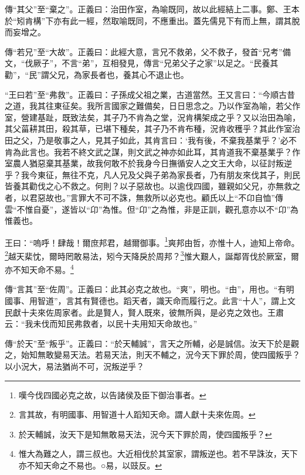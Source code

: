 {\noindent\zhuan{}\fzbyks 傳“其父”至“棄之”。正義曰：治田作室，為喻既同，故以此經結上二事。鄭、王本於“矧肯構”下亦有此一經，然取喻既同，不應重出。蓋先儒見下有而上無，謂其脫而妄增之。 \par}

{\noindent\zhuan{}\fzbyks 傳“若兄”至“大故”。正義曰：此經大意，言兄不救弟，父不救子，發首“兄考”備文，“伐厥子”，不言“弟”，互相發見，傳言“兄弟父子之家”以足之。“民養其勸”，“民”謂父兄，為家長者也，養其心不退止也。 \par}

{\noindent\shu{}\fzkt “王曰若”至“弗救”。正義曰：子孫成父祖之業，古道當然。王又言曰：“今順古昔之道，我其往東征矣。我所言國家之難備矣，日日思念之。乃以作室為喻，若父作室，營建基趾，既致法矣，其子乃不肯為之堂，況肯構架成之乎？又以治田為喻，其父菑耕其田，殺其草，已堪下種矣，其子乃不肯布種，況肯收穫乎？其此作室治田之父，乃是敬事之人，見其子如此，其肯言曰：‘我有後，不棄我基業乎？’必不肯為此言也。我若不終文武之謀，則文武之神亦如此耳，其肯道我不棄基業乎？作室農人猶惡棄其基業，故我何敢不於我身今日撫循安人之文王大命，以征討叛逆乎？我今東征，無往不克，凡人兄及父與子弟為家長者，乃有朋友來伐其子，則民皆養其勸伐之心不救之。何則？以子惡故也。以逾伐四國，雖親如父兄，亦無救之者，以君惡故也。”言罪大不可不誅，無救所以必克也。顧氏以上“不卬自恤”傳雲“不惟自憂”，遂皆以“卬”為惟。但“卬”之為惟，非是正訓，觀孔意亦以不“卬”為惟義也。 \par}

王曰：“嗚呼！肆哉！爾庶邦君，越爾御事。\footnote{嘆今伐四國必克之故，以告諸侯及臣下御治事者。}爽邦由哲，亦惟十人，迪知上帝命。\footnote{言其故，有明國事、用智道十人蹈知天命。謂人獻十夫來佐周。}越天棐忱，爾時罔敢易法，矧今天降戾於周邦？\footnote{於天輔誠，汝天下是知無敢易天法，況今天下罪於周，使四國叛乎？}惟大艱人，誕鄰胥伐於厥室，爾亦不知天命不易。\footnote{惟大為難之人，謂三叔也。大近相伐於其室家，謂叛逆也。若不早誅汝，天下亦不知天命之不易也。○易，以豉反。}


{\noindent\zhuan{}\fzbyks 傳“言其”至“佐周”。正義曰：此其必克之故也。“爽”，明也。“由”，用也。“有明國事、用智道”，言其有賢德也。蹈天者，識天命而履行之。此言“十人”，謂上文民獻十夫來佐周家者。此是賢人，賢人既來，彼無所與，是必克之效也。王肅云：“我未伐而知民弗救者，以民十夫用知天命故也。” \par}

{\noindent\zhuan{}\fzbyks 傳“於天”至“叛乎”。正義曰：“於天輔誠”，言天之所輔，必是誠信。汝天下於是觀之，始知無敢變易天法。若易天法，則天不輔之，況今天下罪於周，使四國叛乎？以小況大，易法猶尚不可，況叛逆乎？ \par}

